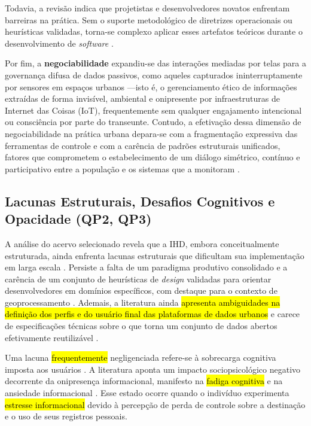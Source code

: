 \documentclass[12pt]{article}
\newcommand{\hlcite}[1]{\colorbox{yellow}{\cite{#1}}} %
\begin{document}
{{    Todavia, a revisão indica que projetistas e desenvolvedores novatos enfrentam barreiras na prática. Sem o suporte metodológico de diretrizes operacionais ou heurísticas validadas, torna-se complexo aplicar esses artefatos teóricos durante o desenvolvimento de \textit{software} \cite{Strey2019Human, Victorelli2020Human, chalhoub2024useful}. 

    Por fim, a \textbf{negociabilidade} expandiu-se das interações mediadas por telas para a governança difusa de dados passivos, como aqueles capturados ininterruptamente por sensores em espaços urbanos \hlcite{Locoro2020}---isto é, o gerenciamento ético de informações extraídas de forma invisível, ambiental e onipresente por infraestruturas de Internet das Coisas (IoT), frequentemente sem qualquer engajamento intencional ou consciência por parte do transeunte. Contudo, a efetivação dessa dimensão de negociabilidade na prática urbana depara-se com a fragmentação expressiva das ferramentas de controle e com a carência de padrões estruturais unificados, fatores que comprometem o estabelecimento de um diálogo simétrico, contínuo e participativo entre a população e os sistemas que a monitoram \hlcite{Chatzimichali2021160}.
        
    \subsection{Lacunas Estruturais, Desafios Cognitivos e Opacidade (QP2, QP3)}

    A análise do acervo selecionado revela que a IHD, embora conceitualmente estruturada, ainda enfrenta lacunas estruturais que dificultam sua implementação em larga escala \hlcite{Sailaja2021Designing, Strey2019Human}. Persiste a falta de um paradigma produtivo consolidado e a carência de um conjunto de heurísticas de \textit{design} validadas para orientar desenvolvedores em domínios específicos, com destaque para o contexto de geoprocessamento \hlcite{Capeleti2024Human}. Ademais, a literatura ainda \hl{apresenta ambiguidades na definição dos perfis e do usuário final das plataformas de dados urbanos} \hlcite{Belizario2023Interacao} e carece de especificações técnicas sobre o que torna um conjunto de dados abertos efetivamente reutilizável \hlcite{Koesten2020}.

    Uma lacuna \hl{frequentemente} negligenciada refere-se à sobrecarga cognitiva imposta aos usuários \cite{Locoro2020}. A literatura aponta um impacto sociopsicológico negativo decorrente da onipresença informacional, manifesto na \hl{fadiga cognitiva} e na ansiedade informacional \cite{cezar2023cognitive}. Esse estado ocorre quando o indivíduo experimenta \hl{estresse informacional} devido à percepção de perda de controle sobre a destinação e o uso de seus registros pessoais.

}}
\end{document}
